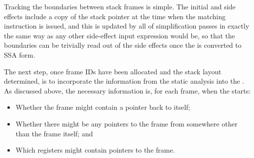 Tracking the boundaries between stack frames is simple.  The initial
 and  side effects include a
copy of the stack pointer at the time when the matching instruction is
issued, and this is updated by all of {\StateMachine} simplification
passes in exactly the same way as any other side-effect input
expression would be, so that the boundaries can be trivially read out
of the side effects once the {\StateMachine} is converted to SSA
form.


The next step, once frame IDs have been allocated and the stack layout
determined, is to incorporate the information from the static analysis
into the {\StateMachine}.  As discussed above, the necessary
information is, for each frame, when the {\StateMachine} starts:

\begin{itemize}
\item
  Whether the frame might contain a pointer back to itself;
\item
  Whether there might be any pointers to the frame from somewhere
  other than the frame itself; and
\item
  Which registers might contain pointers to the frame.
\end{itemize}

